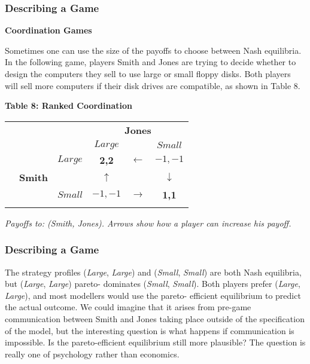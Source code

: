  \begin{frame}[fragile]\frametitle{Describing a Game}
  {\bf   Coordination Games}

 
 Sometimes one can use the size of the payoffs to choose between Nash
equilibria. In the following game, players Smith and Jones are trying to decide
whether to design the computers they sell to use large or small floppy disks.
Both players will sell more computers if their disk drives are compatible, as
shown in Table  8.

\begin{center} {\bf Table  8:     Ranked Coordination    }

 \begin{tabular}{lllccc}
 &       &             &\multicolumn{3}{c}{\bf Jones}\\
&       &             &    $Large$  & & $Small$  \\
 &   &  $Large$   &     {\bf 2,2} & $\leftarrow$  & $-1,-1$ \\
 & {\bf Smith} &     & $\uparrow$  & & $\downarrow$ \\
 &  &       $Small$     &      $-1,-1$ & $\rightarrow$  & {\bf 1,1} \\ & & & &\\
 \end{tabular}
 \end{center}

 {\it Payoffs  to:  (Smith, Jones). Arrows show how a player can increase his
payoff.   }

\end{frame}
 \begin{frame}[fragile]\frametitle{Describing a Game}


         The strategy profiles ({\it Large}, {\it Large}) and ({\it Small}, {\it
Small}) are both Nash equilibria, but ({\it Large}, {\it Large}) pareto-
dominates ({\it Small}, {\it Small}). Both players prefer ({\it Large}, {\it
Large}), and most modellers would use the pareto- efficient equilibrium to
predict the actual outcome.  We could imagine that it arises from pre-game
communication between Smith and Jones taking place outside of the specification
of the model, but the interesting question is what happens if communication is
impossible.  Is the pareto-efficient equilibrium still more plausible? The
question is really one of psychology rather than economics.

\end{frame}
